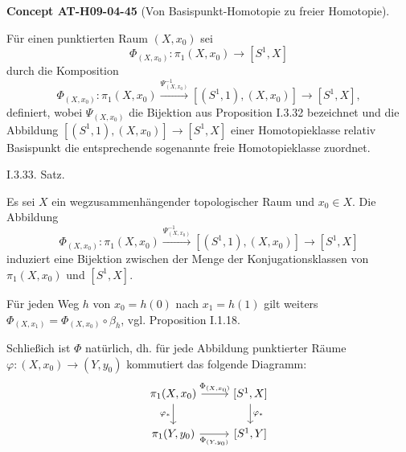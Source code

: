 \documentclass[10pt, letterpaper]{article}
\newcommand{\CustomHeading}[3]{%
  \par\medskip\noindent%
  \textbf{#1 #2} \textnormal{(#3)}.\enskip%
}
\newenvironment{CONC}[2]{\begin{unitbox}\CustomHeading{Concept}{#1}{#2}}{\end{unitbox}}
\begin{document}
\begin{CONC}{AT-H09-04-45}{Von Basispunkt-Homotopie zu freier Homotopie}
Für einen punktierten Raum $\left(X, x_{0}\right)$ sei 
$$\Phi_{\left(X, x_{0}\right)}: \pi_{1}\left(X, x_{0}\right) \rightarrow\left[S^{1}, X\right]$$ 
durch die Komposition
$$
\Phi_{\left(X, x_{0}\right)}: \pi_{1}\left(X, x_{0}\right) \xrightarrow{\Psi_{\left(X, x_{0}\right)}^{-1}}\left[\left(S^{1}, 1\right),\left(X, x_{0}\right)\right] \rightarrow\left[S^{1}, X\right],
$$
definiert, wobei $\Psi_{\left(X, x_{0}\right)}$ die Bijektion aus Proposition I.3.32 bezeichnet und die Abbildung $\left[\left(S^{1}, 1\right),\left(X, x_{0}\right)\right] \rightarrow\left[S^{1}, X\right]$ einer Homotopieklasse relativ Basispunkt die entsprechende sogenannte freie Homotopieklasse zuordnet.
\end{CONC}

I.3.33. Satz. 

Es sei $X$ ein wegzusammenhängender topologischer Raum und $x_0 \in X$. Die Abbildung 
$$\Phi_{\left(X, x_0\right)}: \pi_1\left(X, x_0\right) \xrightarrow{\Psi_{\left(X, x_0\right)}^{-1}}\left[\left(S^1, 1\right),\left(X, x_0\right)\right] \rightarrow\left[S^1, X\right]$$
induziert eine Bijektion zwischen der Menge der Konjugationsklassen von $\pi_1\left(X, x_0\right)$ und $\left[S^1, X\right]$. 

Für jeden Weg $h$ von $x_0=h(0)$ nach $x_1=h(1)$ gilt weiters $\Phi_{\left(X, x_1\right)}=\Phi_{\left(X, x_0\right)} \circ \beta_h$, vgl. Proposition I.1.18. 

Schließich ist $\Phi$ natürlich, dh. für jede Abbildung punktierter Räume $\varphi:\left(X, x_0\right) \rightarrow\left(Y, y_0\right)$ kommutiert das folgende Diagramm:
\[
\begin{tikzcd}
\pi_1(X, x_0) \arrow[r, "\Phi_{(X,x_0)}"] \arrow[d, "\varphi_*"'] & {[S^1, X]} \arrow[d, "\varphi_*"] \\
\pi_1(Y, y_0) \arrow[r, "\Phi_{(Y,y_0)}"'] & {[S^1, Y]}
\end{tikzcd}
\]
\end{document}
